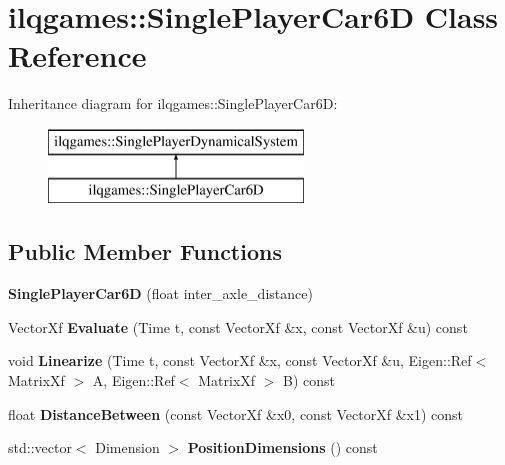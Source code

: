 \hypertarget{classilqgames_1_1_single_player_car6_d}{}\section{ilqgames\+:\+:Single\+Player\+Car6D Class Reference}
\label{classilqgames_1_1_single_player_car6_d}
Inheritance diagram for ilqgames\+:\+:Single\+Player\+Car6D\+:\begin{figure}[H]
\begin{center}
\leavevmode
\includegraphics[height=2.000000cm]{classilqgames_1_1_single_player_car6_d}
\end{center}
\end{figure}
\subsection*{Public Member Functions}
\begin{DoxyCompactItemize}
\item 
{\bfseries Single\+Player\+Car6D} (float inter\+\_\+axle\+\_\+distance)\hypertarget{classilqgames_1_1_single_player_car6_d_a1447d0191222caa085c9136e776b75a2}{}\label{classilqgames_1_1_single_player_car6_d_a1447d0191222caa085c9136e776b75a2}

\item 
Vector\+Xf {\bfseries Evaluate} (Time t, const Vector\+Xf \&x, const Vector\+Xf \&u) const \hypertarget{classilqgames_1_1_single_player_car6_d_a60e07c8bde8c99b24f674b78b61c1f82}{}\label{classilqgames_1_1_single_player_car6_d_a60e07c8bde8c99b24f674b78b61c1f82}

\item 
void {\bfseries Linearize} (Time t, const Vector\+Xf \&x, const Vector\+Xf \&u, Eigen\+::\+Ref$<$ Matrix\+Xf $>$ A, Eigen\+::\+Ref$<$ Matrix\+Xf $>$ B) const \hypertarget{classilqgames_1_1_single_player_car6_d_ab0c9fb5d14a4545db7692a54e5320007}{}\label{classilqgames_1_1_single_player_car6_d_ab0c9fb5d14a4545db7692a54e5320007}

\item 
float {\bfseries Distance\+Between} (const Vector\+Xf \&x0, const Vector\+Xf \&x1) const \hypertarget{classilqgames_1_1_single_player_car6_d_a4874842c55f3591e26707e1440466ff6}{}\label{classilqgames_1_1_single_player_car6_d_a4874842c55f3591e26707e1440466ff6}

\item 
std\+::vector$<$ Dimension $>$ {\bfseries Position\+Dimensions} () const \hypertarget{classilqgames_1_1_single_player_car6_d_abd33eafcc1243df1bac72006fc8fd0f5}{}\label{classilqgames_1_1_single_player_car6_d_abd33eafcc1243df1bac72006fc8fd0f5}

\end{DoxyCompactItemize}
